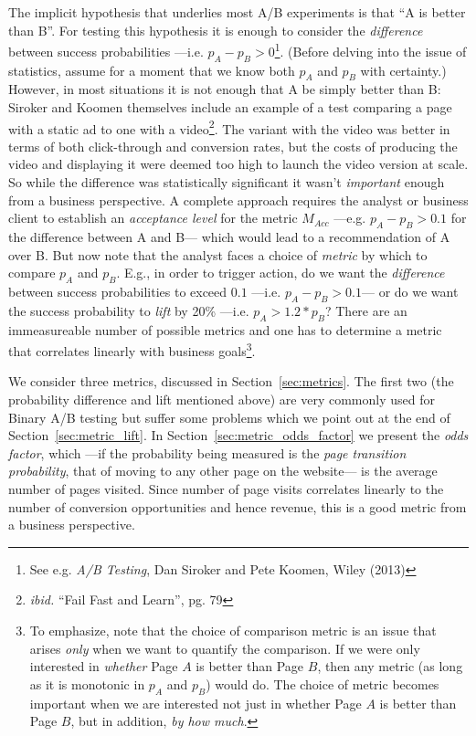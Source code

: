 \documentclass[letterpaper,12pt]{article}
\begin{document}
The implicit hypothesis that underlies most A/B experiments is that
``A is better than B''. For testing this hypothesis it is enough to
consider the {\em difference} between success probabilities
---i.e. \(p_A-p_B>0\)\footnote{See e.g. {\em A/B Testing}, Dan Siroker
  and Pete Koomen, Wiley (2013)}. (Before delving into the issue of
statistics, assume for a moment that we know both \(p_A\) and \(p_B\)
with certainty.) However, in most situations it is not enough
that A be simply better than B: Siroker and Koomen themselves include
an example of a test comparing a page with a static ad to one with a
video\footnote{{\em ibid.} ``Fail Fast and Learn'', pg. 79}. The
variant with the video was better in terms of both click-through and
conversion rates, but the costs of producing the video and displaying
it were deemed too high to launch the video version at scale. So while
the difference was statistically significant it wasn't {\em important}
enough from a business perspective. A complete approach requires the
analyst or business client to establish an {\em acceptance level} for
the metric \(M_{Acc}\) ---e.g. \(p_A-p_B>0.1\) for the difference
between A and B--- which would lead to a recommendation of A over
B. But now note that the analyst faces a choice of {\em metric} by
which to compare \(p_A\) and \(p_B\). E.g., in order to trigger
action, do we want the {\em difference} between success probabilities
to exceed \(0.1\) ---i.e. \(p_A-p_B>0.1\)--- or do we want the success
probability to {\em lift} by 20\% ---i.e. \(p_A > 1.2*p_B\)? There are
an immeasureable number of possible metrics and one has to determine a
metric that correlates linearly with business goals\footnote{To
  emphasize, note that the choice of comparison metric is an issue
  that arises {\em only} when we want to quantify the comparison. If
  we were only interested in {\em whether} Page \(A\) is better than
  Page \(B\), then any metric (as long as it is monotonic in \(p_A\)
  and \(p_B\)) would do. The choice of metric becomes important when
  we are interested not just in whether Page \(A\) is better than Page
  \(B\), but in addition, {\em by how much}.}.

We consider three metrics, discussed in Section~\ref{sec:metrics}. The
first two (the probability difference and lift mentioned above) are
very commonly used for Binary A/B testing but suffer some problems
which we point out at the end of Section~\ref{sec:metric_lift}. In
Section~\ref{sec:metric_odds_factor} we present the {\em odds factor},
which ---if the probability being measured is the {\em page transition
  probability}, that of moving to any other page on the website--- is
the average number of pages visited. Since number of page visits
correlates linearly to the number of conversion opportunities and
hence revenue, this is a good metric from a business perspective.
\end{document}
